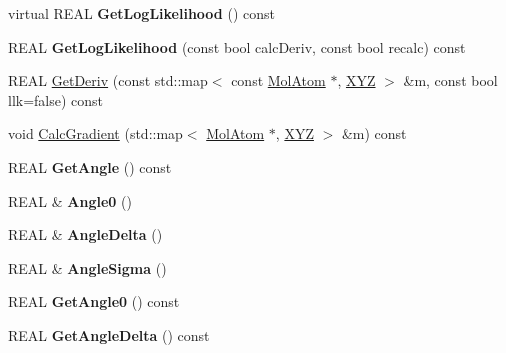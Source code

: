 \begin{DoxyCompactItemize}
virtual R\+E\+AL {\bfseries Get\+Log\+Likelihood} () const
\item 
\mbox{\label{class_obj_cryst_1_1_mol_dihedral_angle_a5c3974abf1db342eefd864d565c58348}} 
R\+E\+AL {\bfseries Get\+Log\+Likelihood} (const bool calc\+Deriv, const bool recalc) const
\item 
R\+E\+AL \mbox{\hyperlink{class_obj_cryst_1_1_mol_dihedral_angle_aee963422a0441a91408f8c888af098d2}{Get\+Deriv}} (const std\+::map$<$ const \mbox{\hyperlink{class_obj_cryst_1_1_mol_atom}{Mol\+Atom}} $\ast$, \mbox{\hyperlink{struct_obj_cryst_1_1_x_y_z}{X\+YZ}} $>$ \&m, const bool llk=false) const
\item 
void \mbox{\hyperlink{class_obj_cryst_1_1_mol_dihedral_angle_a9069b015834a8efe983b42bf35b75f4f}{Calc\+Gradient}} (std\+::map$<$ \mbox{\hyperlink{class_obj_cryst_1_1_mol_atom}{Mol\+Atom}} $\ast$, \mbox{\hyperlink{struct_obj_cryst_1_1_x_y_z}{X\+YZ}} $>$ \&m) const
\item 
\mbox{\label{class_obj_cryst_1_1_mol_dihedral_angle_af758a755c2b94938cb43064981bf0e2f}} 
R\+E\+AL {\bfseries Get\+Angle} () const
\item 
\mbox{\label{class_obj_cryst_1_1_mol_dihedral_angle_ac9b6ece841dab9ce531ad2250da82069}} 
R\+E\+AL \& {\bfseries Angle0} ()
\item 
\mbox{\label{class_obj_cryst_1_1_mol_dihedral_angle_a9eac13868bc3c83454582632b57d040c}} 
R\+E\+AL \& {\bfseries Angle\+Delta} ()
\item 
\mbox{\label{class_obj_cryst_1_1_mol_dihedral_angle_a9d73378072684aa1e2462bad62df9d73}} 
R\+E\+AL \& {\bfseries Angle\+Sigma} ()
\item 
\mbox{\label{class_obj_cryst_1_1_mol_dihedral_angle_aed7d352ce6fa5b725e4f8ebb93cd6242}} 
R\+E\+AL {\bfseries Get\+Angle0} () const
\item 
\mbox{\label{class_obj_cryst_1_1_mol_dihedral_angle_a9209fc26605f6d97df277be64daf9851}} 
R\+E\+AL {\bfseries Get\+Angle\+Delta} () const

\end{DoxyCompactItemize}
